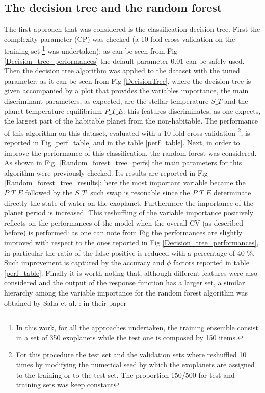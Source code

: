 \documentclass[
12pt, %
a4paper, %
oneside, %
headinclude,footinclude, %
BCOR5mm, %
]{scrartcl}
\begin{document}
\clearpage

\subsection{The decision tree and the random forest}
The first approach that was considered is the classification decision tree. First the complexity parameter (CP) was checked (a 10-fold cross-validation on the training set \footnote{In this work, for all the approaches undertaken, the training ensemble consist in a set of 350 exoplanets while the test one is composed by 150 items. } was undertaken): as can be seen from Fig \ref{Decision_tree_performances} the default parameter $0.01$ can be safely used. Then the decision tree algorithm was applied to the dataset with the tuned parameter: as it can be seen from Fig \ref{DecisionTree}, where the decision tree is given accompanied by a plot that provides the variables importance,  the main discriminant parameters, as expected, are the stellar temperature $S\_T$ and the planet temperature equilibrium $P\_T\_E$: this features discriminates, as one expects, the largest part of the habitable planet from the non-habitable. The performance of this algorithm on this dataset, evaluated with a 10-fold cross-validation \footnote{For this procedure the test set and the validation sets where reshuffled 10 times by modifying the numerical seed by which the exoplanets are assigned to the training or to the test set. The proportion 150/500 for test and training sets was keep constant}, is reported in Fig \ref{perf_table} and in the table \ref{perf_table}. Next, in order to improve the performance of this classification, the random forest was considered. As shown in Fig. \ref{Random_forest_tree_perfs} the main parameters for this algorithm were previously checked. Its results are reported in Fig \ref{Random_forest_tree_results}: here the most important variable became the $P\_T\_E$ followed by the $S\_T$: such swap is resonable since the $P\_T\_E$ determinate directly the state of water on the exoplanet. Furthermore the importance of the planet period is increased.  This reshuffling of the variable importance positively reflects on the performances of the model when the overall CV (as described before) is performed: as one can note from Fig the performances are slightly improved with respect to the ones reported in Fig \ref{Decision_tree_performances}, in particular the ratio of the false positive is reduced with a percentage of 40 $\%$. Such improvement is captured by the accuracy and $\phi$ factors reported in table \ref{perf_table}. Finally it is worth noting that, although  different features were also considered and the output of the response function has a larger set,  a similar hierarchy  among the variable importance for the random forest algorithm was obtained by Saha et al. \cite{saha2018machine}: in their paper 
\end{document}

